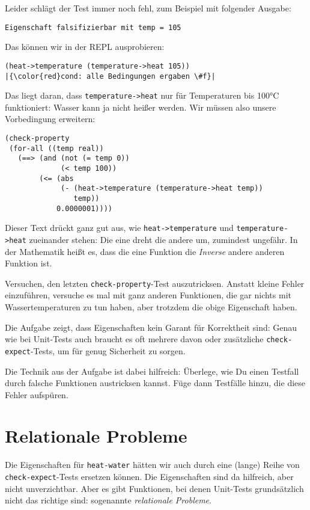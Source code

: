 Leider schlägt der Test immer noch fehl, zum Beispiel mit folgender
Ausgabe:
%
\begin{lstlisting}
Eigenschaft falsifizierbar mit temp = 105
\end{lstlisting}
%
Das können wir in der REPL ausprobieren:
%
\begin{lstlisting}
(heat->temperature (temperature->heat 105))
|{\color{red}cond: alle Bedingungen ergaben \#f}|
\end{lstlisting}
%
Das liegt daran, dass \lstinline{temperature->heat} nur für
Temperaturen bis 100\si{\degree}C funktioniert: Wasser kann ja nicht
heißer werden.  Wir müssen also unsere Vorbedingung erweitern:
%
\begin{lstlisting}
(check-property
 (for-all ((temp real))
   (==> (and (not (= temp 0))
             (< temp 100))
        (<= (abs
             (- (heat->temperature (temperature->heat temp))
                temp))
            0.0000001))))
\end{lstlisting}
%
Dieser Text drückt ganz gut aus, wie \lstinline{heat->temperature} und
\lstinline{temperature->heat} zueinander stehen: Die eine dreht die
andere um, zumindest ungefähr.  In der Mathematik heißt es, dass die
eine Funktion die \textit{Inverse} andere anderen Funktion
ist.

\begin{aufgabeinline}
  Versuchen, den letzten \lstinline{check-property}-Test
  auszutricksen.  Anstatt kleine Fehler einzuführen, versuche es mal
  mit ganz anderen Funktionen, die gar nichts mit Wassertemperaturen
  zu tun haben, aber trotzdem die obige Eigenschaft haben.
\end{aufgabeinline}
%
Die Aufgabe zeigt, dass Eigenschaften kein Garant für Korrektheit
sind: Genau wie bei Unit-Tests auch braucht es oft mehrere davon oder
zusätzliche \lstinline{check-expect}-Tests, um für genug Sicherheit zu
sorgen.

Die Technik aus der Aufgabe ist dabei hilfreich: Überlege, wie Du
einen Testfall durch falsche Funktionen austricksen kannst.  Füge dann
Testfälle hinzu, die diese Fehler aufspüren.



\section{Relationale Probleme}

Die Eigenschaften für \lstinline{heat-water} hätten wir auch durch
eine (lange) Reihe von \lstinline{check-expect}-Tests ersetzen können.
Die Eigenschaften sind da hilfreich, aber nicht unverzichtbar.  Aber
es gibt Funktionen, bei denen Unit-Tests grundsätzlich nicht das
richtige sind: sogenannte \textit{relationale Probleme}.

